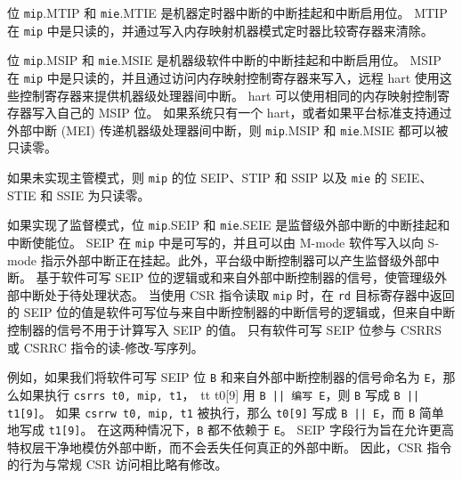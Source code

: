 位 {\tt mip}.MTIP 和 {\tt mie}.MTIE 是机器定时器中断的中断挂起和中断启用位。
MTIP 在 {\tt mip} 中是只读的，并通过写入内存映射机器模式定时器比较寄存器来清除。

位 {\tt mip}.MSIP 和 {\tt mie}.MSIE 是机器级软件中断的中断挂起和中断启用位。 MSIP 在 {\tt mip} 中是只读的，并且通过访问内存映射控制寄存器来写入，远程 hart 使用这些控制寄存器来提供机器级处理器间中断。
hart 可以使用相同的内存映射控制寄存器写入自己的 MSIP 位。 如果系统只有一个 hart，或者如果平台标准支持通过外部中断 (MEI) 传递机器级处理器间中断，则 {\tt mip}.MSIP 和 {\tt mie}.MSIE 都可以被只读零。

如果未实现主管模式，则 {\tt mip} 的位 SEIP、STIP 和 SSIP 以及 {\tt mie} 的 SEIE、STIE 和 SSIE 为只读零。

如果实现了监督模式，位 {\tt mip}.SEIP 和 {\tt mie}.SEIE 是监督级外部中断的中断挂起和中断使能位。
SEIP 在 {\tt mip} 中是可写的，并且可以由 M-mode 软件写入以向 S-mode 指示外部中断正在挂起。此外，平台级中断控制器可以产生监督级外部中断。
基于软件可写 SEIP 位的逻辑或和来自外部中断控制器的信号，使管理级外部中断处于待处理状态。
当使用 CSR 指令读取 {\tt mip} 时，在 {\tt rd} 目标寄存器中返回的 SEIP 位的值是软件可写位与来自中断控制器的中断信号的逻辑或，但来自中断控制器的信号不用于计算写入 SEIP 的值。
只有软件可写 SEIP 位参与 CSRRS 或 CSRRC 指令的读-修改-写序列。

\iffalse
\begin{commentary}
  For example, if we name the software-writable SEIP bit {\tt B} and the
  signal from the external interrupt controller {\tt E}, then if \mbox{\tt csrrs
  t0, mip, t1} is executed, {\tt t0[9]} is written with \mbox{\tt B || E}, then
  {\tt B} is written with \mbox{\tt B || t1[9]}.
  If \mbox{\tt csrrw t0, mip, t1} is executed, then {\tt t0[9]} is written with
  \mbox{\tt B || E}, and {\tt B} is simply written with {\tt t1[9]}.
  In neither case does {\tt B} depend upon {\tt E}.

  The SEIP field behavior is designed to allow a higher privilege
  layer to mimic external interrupts cleanly, without losing any real
  external interrupts.  The behavior of the CSR instructions is
  slightly modified from regular CSR accesses as a result.
\end{commentary}
\fi

\begin{commentary}
  例如，如果我们将软件可写 SEIP 位 {\tt B} 和来自外部中断控制器的信号命名为 {\tt E}，那么如果执行 \mbox{\tt csrrs t0, mip, t1}，{\ tt t0[9]} 用 \mbox{\tt B || 编写 E}，则 {\tt B} 写成 \mbox{\tt B || t1[9]}。 如果 \mbox{\tt csrrw t0, mip, t1} 被执行，那么 {\tt t0[9]} 写成 \mbox{\tt B || E}，而 {\tt B} 简单地写成 {\tt t1[9]}。 在这两种情况下，{\tt B} 都不依赖于 {\tt E}。 SEIP 字段行为旨在允许更高特权层干净地模仿外部中断，而不会丢失任何真正的外部中断。 因此，CSR 指令的行为与常规 CSR 访问相比略有修改。
\end{commentary}


